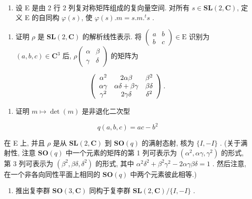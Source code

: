 \begin{enumerate}
\def\labelenumi{\arabic{enumi}.}
\setcounter{enumi}{2}
\tightlist
\item
  设 E 是由 2 行 2 列复对称矩阵组成的复向量空间. 对所有 \(s \in \mathbf{SL}(2, \mathbf{C})\), 定义 E 的自同构 \(\varphi(s)\), 使 \(\varphi(s).m = s.m.^t s\) .
\end{enumerate}

\begin{enumerate}
\def\labelenumi{(\alph{enumi})}
\tightlist
\item
  证明 \(\rho\) 是 \(\mathbf{SL}(2, \mathbf{C})\) 的解析线性表示. 将 \(\begin{pmatrix} a & b \\ b & c \end{pmatrix} \in \mathrm{E}\) 识别为 \((a, b, c) \in \mathbf{C}^3\) 后, \(\rho\begin{pmatrix} \alpha & \beta \\ \gamma & \delta \end{pmatrix}\) 的矩阵为
\end{enumerate}

\[
\left( \begin{array}{c c c} \alpha^ {2} & 2 \alpha \beta & \beta^ {2} \\ \alpha \gamma & \alpha \delta + \beta \gamma & \beta \delta \\ \gamma^ {2} & 2 \gamma \delta & \delta^ {2} \end{array} \right).
\]

\begin{enumerate}
\def\labelenumi{(\alph{enumi})}
\setcounter{enumi}{1}
\tightlist
\item
  证明 \(m \mapsto \det(m)\) 是非退化二次型
\end{enumerate}

\[
q (a, b, c) = a c - b ^ {2}
\]

在 E 上, 并且 \(\rho\) 是从 \(\mathbf{SL}(2,\mathbf{C})\) 到 \(\mathbf{SO}(q)\) 的满射态射, 核为 \(\{I, - I\}\) . (关于满射性, 注意 \(\mathbf{SO}(q)\) 中一个元素的矩阵的第 1 列可表示为 \((\alpha^2,\alpha \gamma ,\gamma^2)\) 的形式, 第 3 列可表示为 \((\beta^2,\beta \delta ,\delta^2)\) 的形式, 其中 \(\alpha^2\delta^2 +\beta^2\gamma^2 -2\alpha \gamma \beta \delta = 1\) . 然后注意, 在一个非各向同性平面上相同的 \(\mathbf{SO}(q)\) 中两个元素彼此相等.)

\begin{enumerate}
\def\labelenumi{(\alph{enumi})}
\setcounter{enumi}{2}
\tightlist
\item
  推出复李群 \(\mathbf{SO}(3, \mathbf{C})\) 同构于复李群 \(\mathbf{SL}(2, \mathbf{C}) / \{I, -I\}\) .
\end{enumerate}

